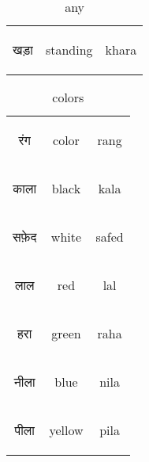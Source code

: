 \begin{table}[H]
    \centering
    \begin{tabular}{c|c|c}        
    \begin{hindi} खड़ा \end{hindi} & standing & khara \\
    \end{tabular}
    \caption{any}
    \label{tab:adjectives_any}
\end{table}


\begin{table}[H]
    \centering
    \begin{tabular}{c|c|c}        
    \begin{hindi} रंग \end{hindi} & color & rang \\
    \begin{hindi} काला \end{hindi} & black & kala \\
    \begin{hindi} सफ़ेद \end{hindi} & white & safed \\
    \begin{hindi} लाल\end{hindi} & red & lal \\
    \begin{hindi} हरा\end{hindi} & green & raha \\
    \begin{hindi} नीला\end{hindi} & blue & nila \\
    \begin{hindi} पीला\end{hindi} & yellow & pila \\
    \end{tabular}
    \caption{colors}
    \label{tab:adjectives_colors}
\end{table}

